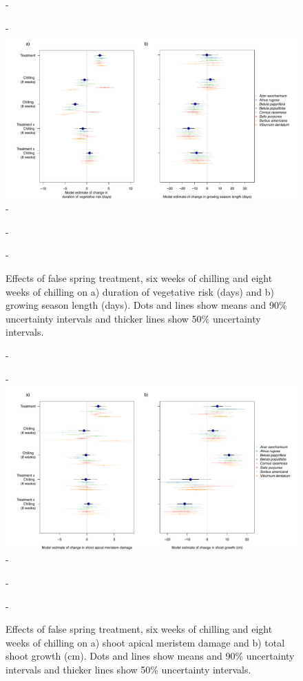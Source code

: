 \documentclass{article}\usepackage[]{graphicx}\usepackage[]{color}
\begin{document}
  {\begin{figure} [H]
  -\begin{center}
  -\includegraphics[width=18cm]{..//analyses/figures/mu_phen.pdf} 
  -\caption{Effects of false spring treatment, six weeks of chilling and eight weeks of chilling on a) duration of vegetative risk (days) and b) growing season length (days). Dots and lines show means and 90\% uncertainty intervals and thicker lines show 50\% uncertainty intervals.}\label{fig:muphen}
  -\end{center}
  -\end{figure}}
  
  {\begin{figure} [H]
  -\begin{center}
  -\includegraphics[width=18cm]{..//analyses/figures/mu_growth.pdf} 
  -\caption{Effects of false spring treatment, six weeks of chilling and eight weeks of chilling on a) shoot apical meristem damage and b) total shoot growth (cm). Dots and lines show means and 90\% uncertainty intervals and thicker lines show 50\% uncertainty intervals. }\label{fig:mugrowth}
  -\end{center}
  -\end{figure}}
  
\end{document}
